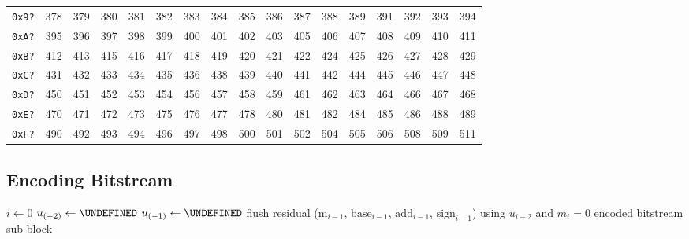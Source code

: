 {\begin{tabular}{|r|r|r|r|r|r|r|r|r|r|r|r|r|r|r|r|r|}
\texttt{0x9?} & 378 & 379 & 380 & 381 & 382 & 383 & 384 & 385 & 386 & 387 & 388 & 389 & 391 & 392 & 393 & 394 \\
\texttt{0xA?} & 395 & 396 & 397 & 398 & 399 & 400 & 401 & 402 & 403 & 405 & 406 & 407 & 408 & 409 & 410 & 411 \\
\texttt{0xB?} & 412 & 413 & 415 & 416 & 417 & 418 & 419 & 420 & 421 & 422 & 424 & 425 & 426 & 427 & 428 & 429 \\
\texttt{0xC?} & 431 & 432 & 433 & 434 & 435 & 436 & 438 & 439 & 440 & 441 & 442 & 444 & 445 & 446 & 447 & 448 \\
\texttt{0xD?} & 450 & 451 & 452 & 453 & 454 & 456 & 457 & 458 & 459 & 461 & 462 & 463 & 464 & 466 & 467 & 468 \\
\texttt{0xE?} & 470 & 471 & 472 & 473 & 475 & 476 & 477 & 478 & 480 & 481 & 482 & 484 & 485 & 486 & 488 & 489 \\
\texttt{0xF?} & 490 & 492 & 493 & 494 & 496 & 497 & 498 & 500 & 501 & 502 & 504 & 505 & 506 & 508 & 509 & 511 \\
\hline
\end{tabular}
}

\clearpage

\subsection{Encoding Bitstream}
{
$i \leftarrow 0$\;
$u_{(-2)} \leftarrow \text{\UNDEFINED}$\;
$u_{(-1)} \leftarrow \text{\UNDEFINED}$\;
flush residual ($\text{m}_{i - 1}$, $\text{base}_{i - 1}$, $\text{add}_{i - 1}$, $\text{sign}_{i - 1}$) using $u_{i - 2}$ and $m_i = 0$\;
\Return encoded bitstream sub block\;
\EALGORITHM
}

